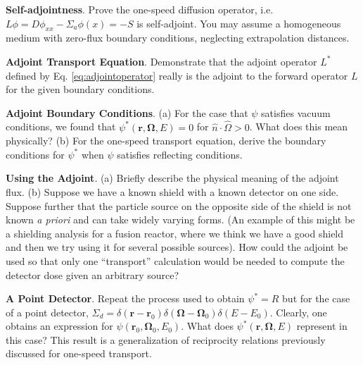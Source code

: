 \begin{exercises}

  \item \textbf{Self-adjointness}. Prove the one-speed diffusion operator, i.e. $L\phi = D\phi_{xx} - \Sigma_a\phi(x) = -S$ is self-adjoint.  You may assume a homogeneous medium with zero-flux boundary conditions, neglecting extrapolation distances.

  \item \textbf{Adjoint Transport Equation}. Demonstrate that the adjoint operator $L^*$ defined by Eq. \ref{eq:adjointoperator} really is the adjoint to the forward operator $L$ for the given boundary conditions.

  \item \textbf{Adjoint Boundary Conditions}. (a) For the case that $\psi$ satisfies vacuum conditions, we found that $\psi^*(\mathbf{r},\mathbf{\Omega},E)=0$ for $\hat{n}\cdot \hat{\Omega} > 0$.  What does this mean physically?  (b) For the one-speed transport equation, derive the boundary conditions for $\psi^*$ when $\psi$ satisfies reflecting conditions.

  \item \textbf{Using the Adjoint}. (a) Briefly describe the physical meaning of the adjoint flux. (b) Suppose we have a known shield with a known detector on one side.  Suppose further that the particle source on the opposite side of the shield is not known \textit{a priori} and can take widely varying forms.  (An example of this might be a shielding analysis for a fusion reactor, where we think we have a good shield and then we try using it for several possible sources).  How could the adjoint be used so that only one ``transport'' calculation would be needed to compute the detector dose given an arbitrary source?

  \item \textbf{A Point Detector}. Repeat the process used to obtain $\psi^* = R$ but for the case of a point detector, $\Sigma_d = \delta(\mathbf{r}-\mathbf{r}_0)\delta(\mathbf{\Omega}-\mathbf{\Omega}_0)\delta(E-E_0)$.  Clearly, one obtains an expression for $\psi(\mathbf{r}_0,\mathbf{\Omega}_0,E_0)$.  What does $\psi^*(\mathbf{r},\mathbf{\Omega},E)$ represent in this case?  This result is a generalization of reciprocity relations previously discussed for one-speed transport.


\end{exercises}
